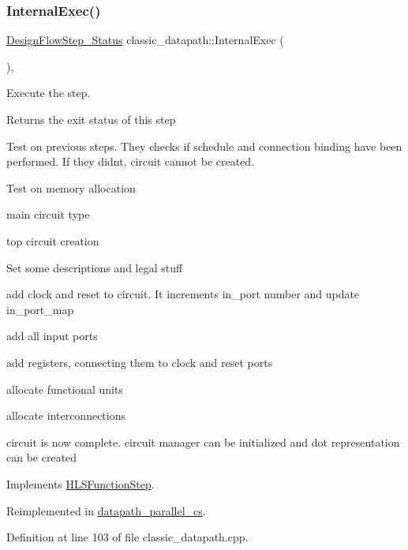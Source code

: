 \subsubsection{\texorpdfstring{Internal\+Exec()}{InternalExec()}}
{\footnotesize\ttfamily \hyperlink{design__flow__step_8hpp_afb1f0d73069c26076b8d31dbc8ebecdf}{Design\+Flow\+Step\+\_\+\+Status} classic\+\_\+datapath\+::\+Internal\+Exec (\begin{DoxyParamCaption}{ }\end{DoxyParamCaption})\hspace{0.3cm}{\ttfamily [override]}, {\ttfamily [virtual]}}



Execute the step. 

\begin{DoxyReturn}{Returns}
the exit status of this step 
\end{DoxyReturn}
Test on previous steps. They checks if schedule and connection binding have been performed. If they didn\textquotesingle{}t, circuit cannot be created.

Test on memory allocation

main circuit type

top circuit creation

Set some descriptions and legal stuff

add clock and reset to circuit. It increments in\+\_\+port number and update in\+\_\+port\+\_\+map

add all input ports

add registers, connecting them to clock and reset ports

allocate functional units

allocate interconnections

circuit is now complete. circuit manager can be initialized and dot representation can be created 

Implements \hyperlink{classHLSFunctionStep_a8db4c00d080655984d98143206fc9fa8}{H\+L\+S\+Function\+Step}.



Reimplemented in \hyperlink{classdatapath__parallel__cs_a62fb8804158d6c6dcf922065f09c688f}{datapath\+\_\+parallel\+\_\+cs}.



Definition at line 103 of file classic\+\_\+datapath.\+cpp.




